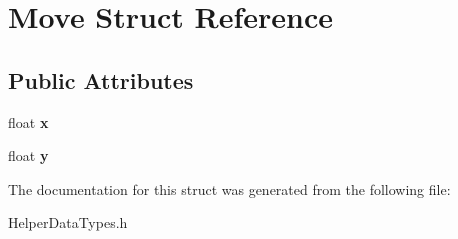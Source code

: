 \hypertarget{structMove}{}\section{Move Struct Reference}
\label{structMove}
\subsection*{Public Attributes}
\begin{DoxyCompactItemize}
\item 
\mbox{\label{structMove_a15a4723eb1501a58104bbffaf71ae297}} 
float {\bfseries x}
\item 
\mbox{\label{structMove_ad9a7db3b23380854c8859c619e0d64b8}} 
float {\bfseries y}
\end{DoxyCompactItemize}


The documentation for this struct was generated from the following file\+:\begin{DoxyCompactItemize}
\item 
Helper\+Data\+Types.\+h\end{DoxyCompactItemize}
